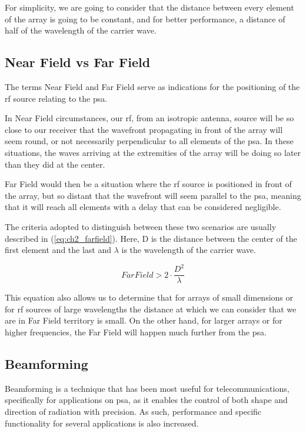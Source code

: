 \par For simplicity, we are going to consider that the distance between every element of the array is going to be constant, and for better performance, a distance of half of the wavelength of the carrier wave.

\subsection{Near Field vs Far Field}
\par The terms Near Field and Far Field serve as indications for the positioning of the \ac{rf} source relating to the \ac{psa}.

\par In Near Field circumstances, our \ac{rf}, from an isotropic antenna, source will be so close to our receiver that the wavefront propagating in front of the array will seem round, or not necessarily perpendicular to all elements of the \ac{psa}. In these situations, the waves arriving at the extremities of the array will be doing so later than they did at the center.

\par Far Field would then be a situation where the \ac{rf} source is positioned in front of the array, but so distant that the wavefront will seem parallel to the \ac{psa}, meaning that it will reach all elements with a delay that can be considered negligible.

\par The criteria adopted to distinguish between these two scenarios are usually described in (\ref{eq:ch2_farfield}). Here, D is the distance between the center of the first element and the last and $\lambda$ is the wavelength of the carrier wave.

\begin{equation}
    \label{eq:ch2_farfield}
    Far Field > 2\cdot\frac{D^{2}}{\lambda}
\end{equation}

\par This equation also allows us to determine that for arrays of small dimensions or for \ac{rf} sources of large wavelengths the distance at which we can consider that we are in Far Field territory is small. On the other hand, for larger arrays or for higher frequencies, the Far Field will happen much further from the \ac{psa}.

\subsection{Beamforming}
\par Beamforming is a technique that has been most useful for telecommunications, specifically for applications on \ac{psa}, as it enables the control of both shape and direction of radiation with precision. As such, performance and specific functionality for several applications is also increased.

